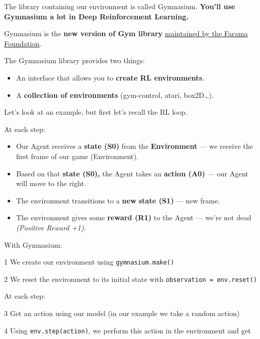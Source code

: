 \documentclass[11pt,a4paper]{article}
\begin{document}
The library containing our environment is called Gymnasium. \textbf{You'll use Gymnasium a lot in Deep Reinforcement Learning.}

Gymnasium is the \textbf{new version of Gym library} \href{https://farama.org/}{maintained by the Farama Foundation}.

The Gymnasium library provides two things:

\begin{itemize}
\tightlist
\item
  An interface that allows you to \textbf{create RL environments}.
\item
  A \textbf{collection of environments} (gym-control, atari, box2D\ldots).
\end{itemize}

Let's look at an example, but first let's recall the RL loop.


At each step:

\begin{itemize}
\tightlist
\item
  Our Agent receives a \textbf{state (S0)} from the \textbf{Environment} --- we receive the first frame of our game (Environment).
\item
  Based on that \textbf{state (S0),} the Agent takes an \textbf{action (A0)} --- our Agent will move to the right.
\item
  The environment transitions to a \textbf{new} \textbf{state (S1)} --- new frame.
\item
  The environment gives some \textbf{reward (R1)} to the Agent --- we're not dead \emph{(Positive Reward +1)}.
\end{itemize}

With Gymnasium:

1 We create our environment using \passthrough{\lstinline!gymnasium.make()!}

2 We reset the environment to its initial state with \passthrough{\lstinline!observation = env.reset()!}

At each step:

3 Get an action using our model (in our example we take a random action)

4 Using \passthrough{\lstinline!env.step(action)!}, we perform this action in the environment and get
\end{document}
